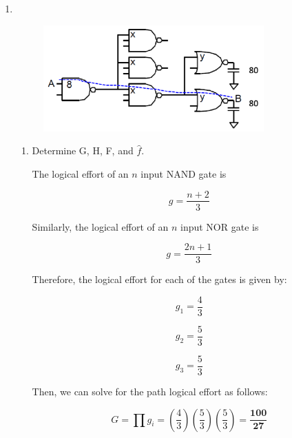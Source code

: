 \documentclass[fleqn]{article}
\begin{document}
\begin{enumerate}
		\item ~
		
			\begin{figure}[H]				
			\centerline{\includegraphics[width=0.8\textwidth]{circuit_question5.png}}
			\label{fig::circuit_question5}
			\end{figure}
		
			\begin{enumerate}
				\item Determine G, H, F, and $\hat{f}$.
				
				The logical effort of an $n$ input NAND gate is
				
				\begin{equation*}
					g = \frac{n+2}{3}
				\end{equation*}
				
				Similarly, the logical effort of an $n$ input NOR gate is
				
				\begin{equation*}
					g = \frac{2n+1}{3}
				\end{equation*}
				
				Therefore, the logical effort for each of the gates is given by:
				
				\begin{equation*}
					g_1 = \frac{4}{3}
				\end{equation*}
				
				\begin{equation*}
					g_2 = \frac{5}{3}
				\end{equation*}
				
				\begin{equation*}
					g_3 = \frac{5}{3}
				\end{equation*}
				
				Then, we can solve for the path logical effort as follows:
				
				\begin{equation*}
					G = \prod{g_i} = \left(\frac{4}{3}\right)\left(\frac{5}{3}\right)\left(\frac{5}{3}\right) = \mathbf{\frac{100}{27}}
				\end{equation*}
				

\end{enumerate}
\end{enumerate}
\end{document}
